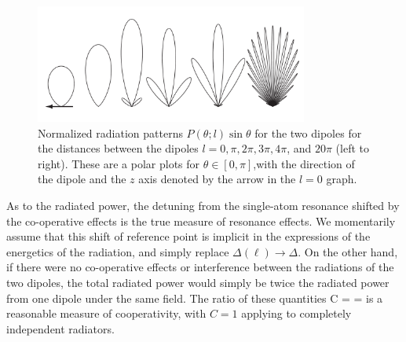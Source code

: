 \begin{figure}[h!]
\begin{center}
\includegraphics[width=0.8\textwidth]{two_atoms.pdf}
\end{center}
\caption[Radiation patterns for two dipoles]{Normalized radiation patterns $P(\theta;l)\sin\theta$ for the two dipoles for the distances between the dipoles $l=0,\pi,2\pi,3\pi,4\pi$, and $20\pi$ (left to right). These are a polar plots for $\theta\in[0,\pi]$,with the direction of the dipole and the $z$ axis denoted by the arrow in the $l=0$ graph.}
\label{TWOATOMS}
\end{figure}

As to the radiated power, the detuning from the single-atom resonance shifted by the co-operative effects is the true measure of resonance effects. We momentarily assume that this shift of reference point is implicit in the expressions of the energetics of the radiation, and simply replace $\Delta(\ell)\rightarrow\Delta$. On the other hand, if there were no co-operative effects or interference between the radiations of the two dipoles, the total radiated power would simply be twice the radiated power from one dipole under the same field. The ratio of these quantities
\beq
C =  = 
\eeq
is a reasonable measure of cooperativity, with $C=1$ applying to completely independent radiators.

